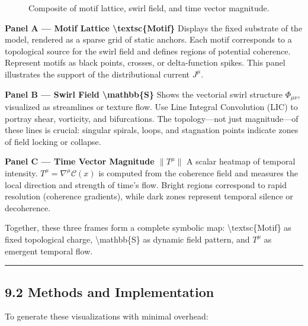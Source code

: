 \documentclass[
  11pt,
]{article}
\begin{document}
\begin{figure}
\begin{minipage}{0.33\linewidth}
{}


\end{minipage}%

\caption{\label{fig-composite}Composite of motif lattice, swirl field,
and time vector magnitude.}

\end{figure}%

\textbf{Panel A --- Motif Lattice \textbackslash textsc\{Motif\}}
Displays the fixed substrate of the model, rendered as a sparse grid of
static anchors. Each motif corresponds to a topological source for the
swirl field and defines regions of potential coherence. Represent motifs
as black points, crosses, or delta-function spikes. This panel
illustrates the support of the distributional current \(J^\mu\).

\textbf{Panel B --- Swirl Field \textbackslash mathbb\{S\}} Shows the
vectorial swirl structure \(\Phi_{\mu\nu}\), visualized as streamlines
or texture flow. Use Line Integral Convolution (LIC) to portray shear,
vorticity, and bifurcations. The topology---not just magnitude---of
these lines is crucial: singular spirals, loops, and stagnation points
indicate zones of field locking or collapse.

\textbf{Panel C --- Time Vector Magnitude \(\|T^\mu\|\)} A scalar
heatmap of temporal intensity. \(T^\mu = \nabla^\mu \mathcal{C}(x)\) is
computed from the coherence field and measures the local direction and
strength of time's flow. Bright regions correspond to rapid resolution
(coherence gradients), while dark zones represent temporal silence or
decoherence.

Together, these three frames form a complete symbolic map:
\textbackslash textsc\{Motif\} as fixed topological charge,
\textbackslash mathbb\{S\} as dynamic field pattern, and \(T^\mu\) as
emergent temporal flow.

\begin{center}\rule{0.5\linewidth}{0.5pt}\end{center}

\subsection{9.2 Methods and
Implementation}\label{methods-and-implementation}

To generate these visualizations with minimal overhead:
\end{document}
